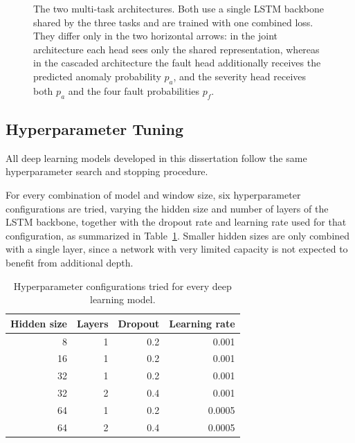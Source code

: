 \begin{figure}[htbp]
{%
}

\caption[Multi-task deep learning architectures]{The two multi-task architectures. Both use a single LSTM
backbone shared by the three tasks and are trained with one combined loss. They differ only in the two
horizontal arrows: in the joint architecture each head sees only the shared representation, whereas in the
cascaded architecture the fault head additionally receives the predicted anomaly probability $p_{a}$, and
the severity head receives both $p_{a}$ and the four fault probabilities $p_{f}$.}
\label{fig:mtl_models}
\end{figure}

\subsection{Hyperparameter Tuning} \label{sec:hyperparameters}

All deep learning models developed in this dissertation follow the same hyperparameter search and stopping procedure.

For every combination of model and window size, six hyperparameter configurations are tried, varying the 
hidden size and number of layers of the LSTM backbone, together with the dropout rate and learning rate 
used for that configuration, as summarized in Table~\ref{tab:hyperparameter_grid}. Smaller hidden sizes 
are only combined with a single layer, since a network with very limited capacity is not expected to 
benefit from additional depth.

\begin{table}[htbp]
\centering
\caption{Hyperparameter configurations tried for every deep learning model.}
\label{tab:hyperparameter_grid}
\small
\begin{tabular}{rrrr}
\hline
\textbf{Hidden size} & \textbf{Layers} & \textbf{Dropout} & \textbf{Learning rate} \\
\hline
8  & 1 & 0.2 & 0.001  \\
16 & 1 & 0.2 & 0.001  \\
32 & 1 & 0.2 & 0.001  \\
32 & 2 & 0.4 & 0.001  \\
64 & 1 & 0.2 & 0.0005 \\
64 & 2 & 0.4 & 0.0005 \\
\hline
\end{tabular}
\end{table}

